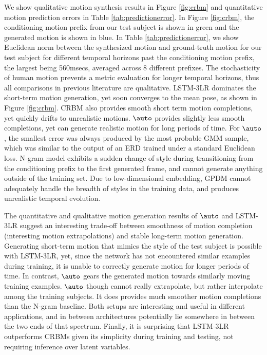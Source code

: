 \documentclass[10pt,twocolumn,letterpaper]{article}
\begin{document}
%
 
We show  qualitative motion synthesis results in Figure \ref{fig:crbm}  and  quantitative motion prediction errors in Table \ref{tab:predictionerror}.  In Figure \ref{fig:crbm},  the conditioning motion prefix from our test subject is shown in green  and the generated motion is shown in blue. 
In Table \ref{tab:predictionerror}, we show Euclidean norm between the synthesized motion  and ground-truth   motion for our test subject  for different temporal horizons past the conditioning motion prefix, the largest being 560msecs, averaged across 8 different prefixes. %
The stochasticity of human motion prevents a metric evaluation for longer temporal horizons, thus all comparisons in previous literature are qualitative.  
LSTM-3LR dominates the short-term motion generation, yet soon converges to the mean pose, as shown in Figure \ref{fig:crbm}. CRBM also provides smooth short term motion completions,  yet quickly drifts to unrealistic motions. $\auto$ provides slightly less smooth completions, yet can generate realistic  motion for long periods of time. For $\auto$, the smallest error was always produced by the most probable GMM sample, which was similar to the output of an ERD trained under a standard Euclidean loss. N-gram model exhibits a sudden change of style during transitioning from the conditioning prefix to the first generated frame, and cannot generate anything outside of the training set. Due to low-dimensional embedding, GPDM cannot adequately handle the breadth of styles in the training data, and produces unrealistic temporal evolution.  


The quantitative and qualitative motion generation results of $\auto$ and LSTM-3LR suggest an interesting trade-off between smoothness of motion completion (interesting motion extrapolations) and stable long-term motion generation. Generating short-term motion that mimics the style of the test subject is possible with LSTM-3LR, yet, since the network has not encountered similar  examples during  training, it is unable to correctly generate motion for longer periods of time. In contrast, $\auto$ gears the  generated motion towards similarly moving training examples. $\auto$  though cannot really extrapolate, but rather interpolate among the training subjects. It does   provides much smoother motion completions than the N-gram baseline. Both setups are interesting and useful in different applications, and in between architectures potentially lie somewhere in between the two ends of that spectrum. Finally, it is surprising that LSTM-3LR outperforms CRBMs given its simplicity during  training and testing, not requiring inference over latent variables. 
\end{document}
